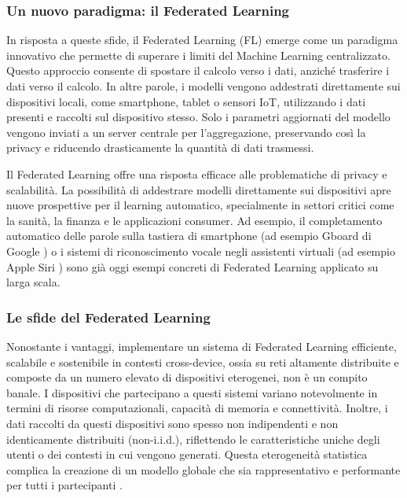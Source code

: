\documentclass[a4paper, oneside, openright]{report}
\begin{document}
\subsubsection*{Un nuovo paradigma: il Federated Learning}
In risposta a queste sfide, il Federated Learning (FL) \cite{DBLP:journals/corr/McMahanMRA16} emerge come un paradigma innovativo che permette di superare i limiti del Machine Learning centralizzato. Questo approccio consente di spostare il calcolo verso i dati, anziché trasferire i dati verso il calcolo. In altre parole, i modelli vengono addestrati direttamente sui dispositivi locali, come smartphone, tablet o sensori IoT, utilizzando i dati presenti e raccolti sul dispositivo stesso. Solo i parametri aggiornati del modello vengono inviati a un server centrale per l’aggregazione, preservando così la privacy e riducendo drasticamente la quantità di dati trasmessi.

Il Federated Learning offre una risposta efficace alle problematiche di privacy e scalabilità. La possibilità di addestrare modelli direttamente sui dispositivi apre nuove prospettive per il learning automatico, specialmente in settori critici come la sanità, la finanza e le applicazioni consumer. Ad esempio, il completamento automatico delle parole sulla tastiera di smartphone (ad esempio Gboard di Google \cite{DBLP:journals/corr/abs-1811-03604}) o i sistemi di riconoscimento vocale negli assistenti virtuali (ad esempio Apple Siri \cite{DBLP:journals/corr/abs-2107-12603}) sono già oggi esempi concreti di Federated Learning applicato su larga scala.

\subsubsection*{Le sfide del Federated Learning}
Nonostante i vantaggi, implementare un sistema di Federated Learning efficiente, scalabile e sostenibile in contesti cross-device, ossia su reti altamente distribuite e composte da un numero elevato di dispositivi eterogenei, non è un compito banale. I dispositivi che partecipano a questi sistemi variano notevolmente in termini di risorse computazionali, capacità di memoria e connettività. Inoltre, i dati raccolti da questi dispositivi sono spesso non indipendenti e non identicamente distribuiti (non-i.i.d.), riflettendo le caratteristiche uniche degli utenti o dei contesti in cui vengono generati. Questa eterogeneità statistica complica la creazione di un modello globale che sia rappresentativo e performante per tutti i partecipanti \cite{li2020convergencefedavgnoniiddata}.
\end{document}
